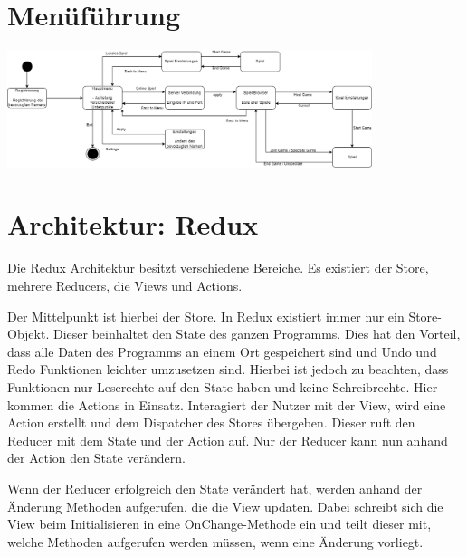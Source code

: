 \documentclass[a4paper]{scrreprt}
\begin{document}
\section{Menüführung}
\includegraphics[width=0.8\textwidth]{menufuehrung.png}

\section{Architektur: Redux}
Die Redux Architektur besitzt verschiedene Bereiche. Es existiert der Store, mehrere Reducers, die Views und Actions.

Der Mittelpunkt ist hierbei der Store. In Redux existiert immer nur ein Store-Objekt. Dieser beinhaltet den State des ganzen Programms. Dies hat den Vorteil, dass alle Daten des Programms an einem Ort gespeichert sind und Undo und Redo Funktionen leichter umzusetzen sind. Hierbei ist jedoch zu beachten, dass Funktionen nur Leserechte auf den State haben und keine Schreibrechte.
Hier kommen die Actions in Einsatz. Interagiert der Nutzer mit der View, wird eine Action erstellt und dem Dispatcher des Stores übergeben. Dieser ruft den Reducer mit dem State und der Action auf. Nur der Reducer kann nun anhand der Action den State verändern.

Wenn der Reducer erfolgreich den State verändert hat, werden anhand der Änderung Methoden aufgerufen, die die View updaten. Dabei schreibt sich die View beim Initialisieren in eine OnChange-Methode ein und teilt dieser mit, welche Methoden aufgerufen werden müssen, wenn eine Änderung vorliegt.
\end{document}
